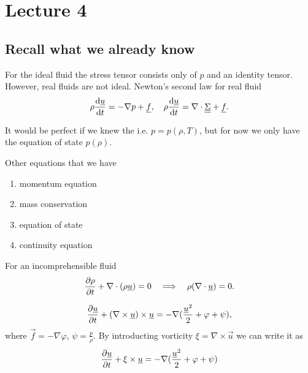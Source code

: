 \documentclass[../main.tex]{subfiles}
\begin{document}
  \chapter{Lecture 4}
  \section{Recall what we already know}
  For the ideal fluid the stress tensor consists only of $p$ and an identity tensor.
  However, real fluids are not ideal. 
  Newton's second law for real fluid
  \begin{displaymath}
    \rho \frac{\mathrm{d} \underline{u}}{\mathrm{d} t} = - \nabla p + \underline{f}, \quad \rho \frac{\mathrm{d} \underline{u}}{\mathrm{d} t} = \nabla\cdot \underline{\underline{{\Sigma}}} + \underline{f}.
  \end{displaymath}

  It would be perfect if we knew the  i.e. $p = p(\rho, T)$, 
  but for now we only have the equation of state $p(\rho)$.

  Other equations that we have
  \begin{enumerate}
    \item momentum equation
    \item mass conservation
    \item equation of state
    \item continuity equation
  \end{enumerate}
  
  For an incomprehensible fluid
  \begin{displaymath}
    \frac{\partial \rho}{\partial t} + \nabla \cdot(\rho \underline{u}) = 0 \quad \Longrightarrow \quad \rho (\nabla \cdot \underline{u}) = 0.
  \end{displaymath}
  

  \begin{displaymath}
    \frac{\partial \underline{u}}{\partial t} + (\nabla \times \underline{u}) \times \underline{u} = - \nabla (\frac{\underline{u}^2}{2} + \varphi + \psi),
  \end{displaymath}
  where $\vec f = - \nabla \varphi$, $\psi = \frac{p}{\rho}$.
  By introducting vorticity $\xi = \nabla \times \vec u$ we can write it as
  \begin{displaymath}
    \frac{\partial \underline{u}}{\partial t} + \xi \times \underline{u} = - \nabla (\frac{\underline{u}^2}{2} + \varphi + \psi)
  \end{displaymath}
\end{document}
